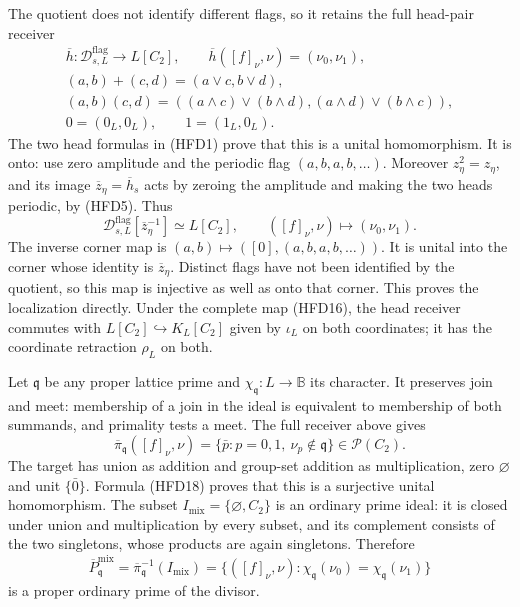 The quotient does not identify different flags,
so it retains the full head-pair receiver
\begin{equation}\tag{HFD18}
 \begin{gathered}
 \overline h:\mathcal D^{\mathrm{flag}}_{s,L}
          \longrightarrow L[C_2],\qquad
 \overline h([f]_\nu,\nu)=(\nu_0,\nu_1),\\
 (a,b)+(c,d)=(a\vee c,b\vee d),\\
 (a,b)(c,d)=((a\wedge c)\vee(b\wedge d),
                     (a\wedge d)\vee(b\wedge c)),\\
 0=(0_L,0_L),\qquad1=(1_L,0_L).
 \end{gathered}
\end{equation}
The two head formulas in (HFD1) prove that
this is a unital homomorphism.
It is onto: use zero amplitude and the
periodic flag $(a,b,a,b,\ldots)$.
Moreover $z_\eta^2=z_\eta$, and its image
$\overline z_\eta=\overline h_s$ acts by
zeroing the amplitude and making the two
heads periodic, by (HFD5). Thus
\begin{equation}\tag{HFD19}
 \mathcal D^{\mathrm{flag}}_{s,L}
                  [\overline z_\eta^{-1}]
       \simeq L[C_2],\qquad
 ([f]_\nu,\nu)\longmapsto(\nu_0,\nu_1).
\end{equation}
The inverse corner map is
$(a,b)\mapsto([0],(a,b,a,b,\ldots))$.
It is unital into the corner whose identity
is $\overline z_\eta$. Distinct flags have
not been identified by the quotient, so this
map is injective as well as onto that corner.
This proves the localization directly.
Under the complete map (HFD16), the head
receiver commutes with
$L[C_2]\hookrightarrow K_L[C_2]$ given by
$\iota_L$ on both coordinates; it has the
coordinate retraction $\rho_L$ on both.

Let $\mathfrak q$ be any proper lattice prime
and $\chi_{\mathfrak q}:L\to\mathbb B$ its
character. It preserves join and meet:
membership of a join in the ideal is equivalent
to membership of both summands, and primality
tests a meet. The full receiver above gives
\begin{equation}\tag{HFD20}
 \overline\pi_{\mathfrak q}([f]_\nu,\nu)
   =\{\bar p:p=0,1,\ \nu_p\notin\mathfrak q\}
                         \in\mathscr P(C_2).
\end{equation}
The target has union as addition and group-set
addition as multiplication, zero $\varnothing$
and unit $\{\bar0\}$. Formula (HFD18) proves
that this is a surjective unital homomorphism.
The subset
$I_{\mathrm{mix}}=\{\varnothing,C_2\}$
is an ordinary prime ideal: it is closed under
union and multiplication by every subset, and
its complement consists of the two singletons,
whose products are again singletons. Therefore
\begin{equation}\tag{HFD21}
 \overline P^{\mathrm{mix}}_{\mathfrak q}
  =\overline\pi_{\mathfrak q}^{-1}(I_{\mathrm{mix}})
  =\{([f]_\nu,\nu):
       \chi_{\mathfrak q}(\nu_0)
                    =\chi_{\mathfrak q}(\nu_1)\}
\end{equation}
is a proper ordinary prime of the divisor.

